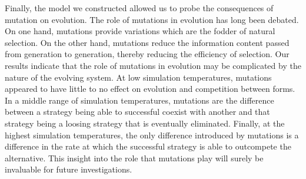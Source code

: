 Finally, the model we constructed allowed us to probe the consequences of mutation on evolution. The role of mutations in evolution has long been debated. On one hand, mutations provide variations which are the fodder of natural selection. On the other hand, mutations reduce the information content passed from generation to generation, thereby reducing the efficiency of selection. Our results indicate that the role of mutations in evolution may be complicated by the nature of the evolving system. At low simulation temperatures, mutations appeared to have little to no effect on evolution and competition between forms. In a middle range of simulation temperatures, mutations are the difference between a strategy being able to successful coexist with another and that strategy being a loosing strategy that is eventually eliminated. Finally, at the highest simulation temperatures, the only difference introduced by mutations is a difference in the rate at which the successful strategy is able to outcompete the alternative. This insight into the role that mutations play will surely be invaluable for future investigations.
